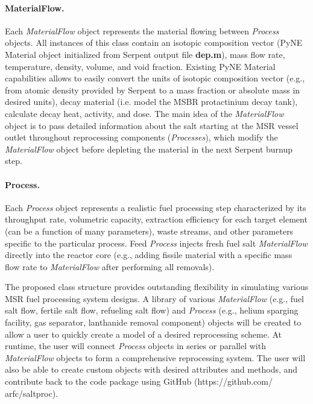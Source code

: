 \paragraph{MaterialFlow.}Each \textit{MaterialFlow} object 
represents the material flowing between \textit{Process} objects. 
All instances of this class contain an isotopic composition vector 
(PyNE Material object initialized from Serpent output file 
\textbf{dep.m}), mass flow rate, 
temperature, density, volume, and void fraction. Existing PyNE Material 
capabilities allows to easily convert the units of isotopic 
composition vector (e.g., from atomic density provided by Serpent to 
a mass fraction or absolute mass in desired units), decay material 
(i.e. model the \gls{MSBR} protactinium decay tank), calculate 
decay heat, activity, and dose. The main idea of the \textit{MaterialFlow} 
object is to pass detailed information about the salt starting at the 
\gls{MSR} vessel outlet throughout reprocessing components 
(\textit{Processes}), which modify the \textit{MaterialFlow} 
object before depleting the material in the next Serpent burnup step.
\paragraph{Process.}Each \textit{Process} object represents a 
realistic fuel processing step characterized by its throughput rate, 
volumetric capacity, extraction efficiency for each target element (can be 
a function of many parameters), waste streams, and other parameters specific 
to the particular process. Feed	\textit{Process} injects fresh fuel salt 
\textit{MaterialFlow} directly into the reactor core (e.g., adding fissile 
material with a specific mass flow rate to \textit{MaterialFlow} after 
performing all removals).

The proposed class structure provides outstanding flexibility in simulating 
various \gls{MSR} fuel processing system designs. A library of various 
\textit{MaterialFlow} (e.g., 
fuel salt flow, fertile salt flow, refueling salt flow) and \textit{Process} 
(e.g., helium sparging facility, gas separator, lanthanide removal component) 
objects will be created to allow a user to quickly create a model 
of a desired reprocessing scheme. At runtime, the user will connect 
\textit{Process} objects in series or parallel with \textit{MaterialFlow} 
objects to form a comprehensive reprocessing system. The user will also be 
able to create custom objects with desired attributes and methods, and 
contribute back to the code package using GitHub (https://github.com/ 
arfc/saltproc).	

